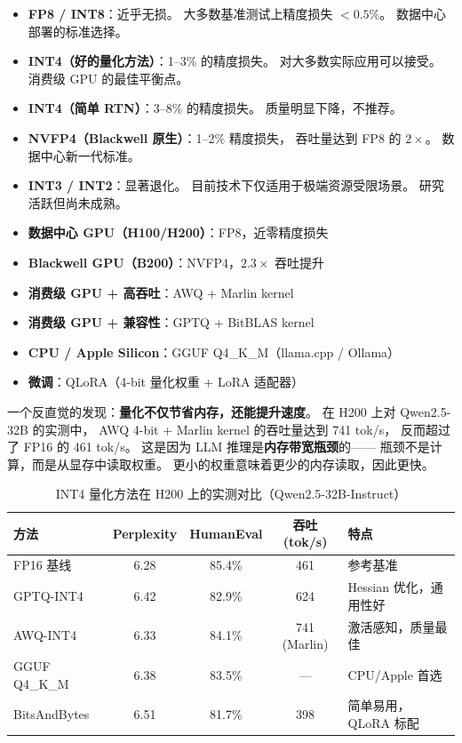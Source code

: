 \begin{keybox}
\begin{itemize}[noitemsep]
  \item \textbf{FP8 / INT8}：近乎无损。
        大多数基准测试上精度损失 $<0.5\%$。
        数据中心部署的标准选择。
  \item \textbf{INT4（好的量化方法）}：1--3\% 的精度损失。
        对大多数实际应用可以接受。
        消费级 GPU 的最佳平衡点。
  \item \textbf{INT4（简单 RTN）}：3--8\% 的精度损失。
        质量明显下降，不推荐。
  \item \textbf{NVFP4（Blackwell 原生）}：1--2\% 精度损失，
        吞吐量达到 FP8 的 $2\times$。
        数据中心新一代标准。
  \item \textbf{INT3 / INT2}：显著退化。
        目前技术下仅适用于极端资源受限场景。
        研究活跃但尚未成熟。
\end{itemize}
\end{keybox}

\begin{keybox}[量化方法速查（2026 年初）]
\begin{itemize}[noitemsep]
  \item \textbf{数据中心 GPU（H100/H200）}：FP8，近零精度损失
  \item \textbf{Blackwell GPU（B200）}：NVFP4，$2.3\times$ 吞吐提升
  \item \textbf{消费级 GPU + 高吞吐}：AWQ + Marlin kernel
  \item \textbf{消费级 GPU + 兼容性}：GPTQ + BitBLAS kernel
  \item \textbf{CPU / Apple Silicon}：GGUF Q4\_K\_M（llama.cpp / Ollama）
  \item \textbf{微调}：QLoRA（4-bit 量化权重 + LoRA 适配器）
\end{itemize}
\end{keybox}

一个反直觉的发现：\textbf{量化不仅节省内存，还能提升速度}。
在 H200 上对 Qwen2.5-32B 的实测中，
AWQ 4-bit + Marlin kernel 的吞吐量达到 741 tok/s，
反而超过了 FP16 的 461 tok/s。
这是因为 LLM 推理是\textbf{内存带宽瓶颈}的——
瓶颈不是计算，而是从显存中读取权重。
更小的权重意味着更少的内存读取，因此更快。

\begin{table}[H]
\centering\small
\caption{INT4 量化方法在 H200 上的实测对比（Qwen2.5-32B-Instruct）}
\begin{tabularx}{\linewidth}{l c c c X}
\toprule
\textbf{方法} & \textbf{Perplexity} & \textbf{HumanEval} & \textbf{吞吐 (tok/s)} & \textbf{特点} \\
\midrule
FP16 基线 & 6.28 & 85.4\% & 461 & 参考基准 \\
GPTQ-INT4 & 6.42 & 82.9\% & 624 & Hessian 优化，通用性好 \\
AWQ-INT4 & 6.33 & 84.1\% & 741 (Marlin) & 激活感知，质量最佳 \\
GGUF Q4\_K\_M & 6.38 & 83.5\% & --- & CPU/Apple 首选 \\
BitsAndBytes & 6.51 & 81.7\% & 398 & 简单易用，QLoRA 标配 \\
\bottomrule
\end{tabularx}
\end{table}

